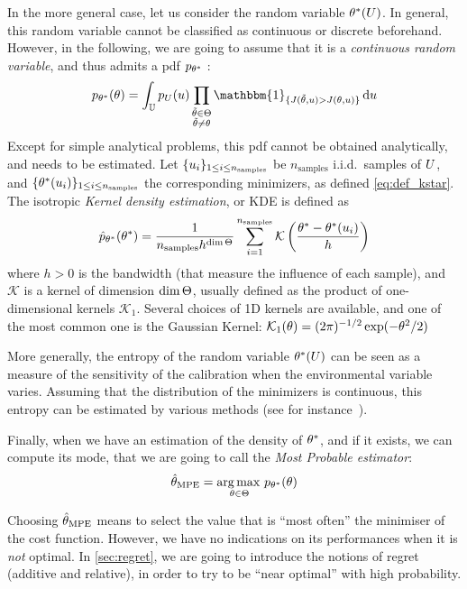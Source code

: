 \documentclass[../../Main_ManuscritThese.tex]{subfiles}
\begin{document}
In the more general case, let us consider the random variable $\theta^*(U)$. In general, this random variable cannot be classified as continuous or discrete beforehand. However, in the following, we are going to assume that it is a \emph{continuous random variable}, and thus admits a pdf $p_{\theta^*}$ \citep{hennig_entropy_2011}:
\begin{equation}
  p_{\KK^*}(\kk) = \int_{\Uspace} p_{\UU}(\uu)\prod_{\substack{\tilde{\kk}\in \Kspace\\\tilde{\kk}\neq \kk}} \mathbbm{1}_{\{J(\tilde{\kk},\uu) > J(\kk, \uu)\}}\,\mathrm{d}\uu
\end{equation}
Except for simple analytical problems, this pdf cannot be obtained analytically, and needs to be estimated.
Let $\{u_i\}_{1\leq i \leq n_{\mathrm{samples}}}$ be $n_{\mathrm{samples}}$ i.i.d.\ samples of $U$, and
$\{\theta^*(u_i)\}_{1\leq i \leq n_{\mathrm{samples}}}$ the corresponding minimizers, as defined \cref{eq:def_kstar}.
The isotropic \emph{Kernel density estimation}, or KDE is defined as
\begin{equation}
  \hat{p}_{\theta^*}(\theta^*) = \frac{1}{n_{\mathrm{samples}} h^{\dim \Theta}} \sum_{i=1}^{n_{\mathrm{samples}}} \mathcal{K}\left(\frac{\theta^* - \theta^*(u_i)}{h}\right)
\end{equation}
where $h>0$ is the bandwidth (that measure the influence of each sample), and $\mathcal{K}$ is a kernel of dimension $\dim \Theta$, usually defined as the product of one-dimensional kernels $\mathcal{K}_1$. Several choices of 1D kernels are available, and one of the most common one is the Gaussian Kernel: $\mathcal{K}_1(\theta) = (2\pi)^{-1/2}\exp(-\theta^2 /2)$

More generally, the entropy of the random variable $\theta^*(U)$ can be seen as a measure of the sensitivity of the calibration when the environmental variable varies.
Assuming that the distribution of the minimizers is continuous, this entropy can be estimated by various methods (see for instance~\cite{beirlant_nonparametric_1997}).

Finally, when we have an estimation of the density of $\theta^*$, and if it exists, we can compute its mode, that we are going to call the \emph{Most Probable estimator}:
\begin{equation}
  \hat{\theta}_{\mathrm{MPE}} = \operatorname*{arg\,max \,}_{\theta \in \Theta} p_{\theta^*}(\theta)
\end{equation}

Choosing $\hat{\theta}_{\mathrm{MPE}}$ means to select the value that is ``most often'' the minimiser of the cost function. However, we have no indications on its performances when it is \emph{not} optimal. In \cref{sec:regret}, we are going to introduce the notions of regret (additive and relative), in order to try to be ``near optimal'' with high probability.
\end{document}
